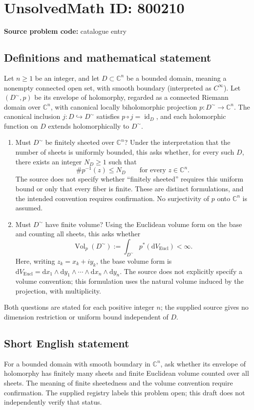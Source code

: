 \documentclass[11pt]{article}
\newcommand{\C}{\mathbb{C}}
\begin{document}
\section*{UnsolvedMath ID: 800210}
\textbf{Source problem code:} catalogue entry
\subsection{Definitions and mathematical statement}
Let \(n\geq 1\) be an integer, and let \(D\subset\C^n\) be a bounded domain, meaning a nonempty connected open set, with smooth boundary (interpreted as \(C^\infty\)). Let \((D^{\sim},p)\) be its envelope of holomorphy, regarded as a connected Riemann domain over \(\C^n\), with canonical locally biholomorphic projection \(p:D^{\sim}\to\C^n\). The canonical inclusion \(j:D\hookrightarrow D^{\sim}\) satisfies \(p\circ j=\operatorname{id}_D\), and each holomorphic function on \(D\) extends holomorphically to \(D^{\sim}\).

\begin{enumerate}
\item[(A)] Must \(D^{\sim}\) be finitely sheeted over \(\C^n\)? Under the interpretation that the number of sheets is uniformly bounded, this asks whether, for every such \(D\), there exists an integer \(N_D\geq 1\) such that
\[
\#p^{-1}(z)\leq N_D\qquad\text{for every }z\in\C^n.
\]
The source does not specify whether ``finitely sheeted'' requires this uniform bound or only that every fiber is finite. These are distinct formulations, and the intended convention requires confirmation. No surjectivity of \(p\) onto \(\C^n\) is assumed.
\item[(B)] Must \(D^{\sim}\) have finite volume? Using the Euclidean volume form on the base and counting all sheets, this asks whether
\[
\operatorname{Vol}_{p}(D^{\sim})
:=\int_{D^{\sim}}p^*(\mathrm{d}V_{\mathrm{Eucl}})<\infty.
\]
Here, writing \(z_k=x_k+i y_k\), the base volume form is \(\mathrm{d}V_{\mathrm{Eucl}}=\mathrm{d}x_1\wedge\mathrm{d}y_1\wedge\cdots\wedge\mathrm{d}x_n\wedge\mathrm{d}y_n\). The source does not explicitly specify a volume convention; this formulation uses the natural volume induced by the projection, with multiplicity.
\end{enumerate}

Both questions are stated for each positive integer \(n\); the supplied source gives no dimension restriction or uniform bound independent of \(D\).
\subsection{Short English statement}
For a bounded domain with smooth boundary in \(\C^n\), ask whether its envelope of holomorphy has finitely many sheets and finite Euclidean volume counted over all sheets. The meaning of finite sheetedness and the volume convention require confirmation. The supplied registry labels this problem open; this draft does not independently verify that status.
\end{document}
